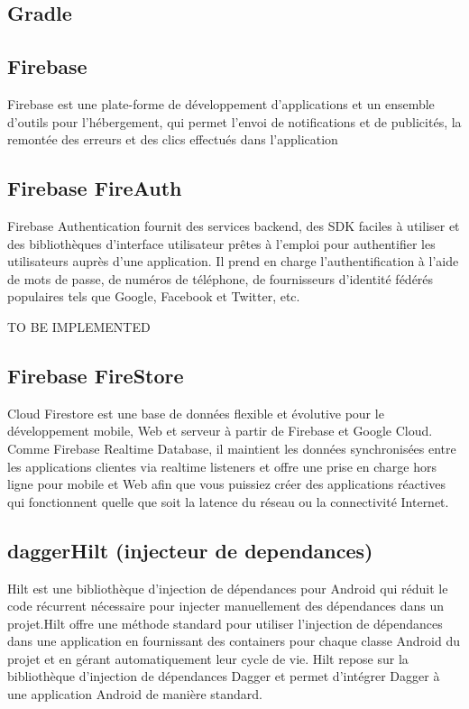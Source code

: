 \subsection{Gradle}
\subsection{Firebase}
Firebase est une plate-forme de développement d'applications et un ensemble d'outils pour l'hébergement, qui permet l'envoi de notifications et de publicités, la remontée des erreurs et des clics effectués dans l'application
\subsection{Firebase FireAuth}
Firebase Authentication fournit des services backend, des SDK faciles à utiliser et des bibliothèques d'interface utilisateur prêtes à l'emploi pour authentifier les utilisateurs auprès d'une application. Il prend en charge l'authentification à l'aide de mots de passe, de numéros de téléphone, de fournisseurs d'identité fédérés populaires tels que Google, Facebook et Twitter, etc.

TO BE IMPLEMENTED
\subsection{Firebase FireStore}
Cloud Firestore est une base de données flexible et évolutive pour le développement mobile, Web et serveur à partir de Firebase et Google Cloud. Comme Firebase Realtime Database, il maintient les données synchronisées entre les applications clientes via realtime listeners et offre une prise en charge hors ligne pour mobile et Web afin que vous puissiez créer des applications réactives qui fonctionnent quelle que soit la latence du réseau ou la connectivité Internet.
\subsection{daggerHilt (injecteur de dependances)}
Hilt est une bibliothèque d'injection de dépendances pour Android qui réduit le code récurrent nécessaire pour injecter manuellement des dépendances dans un projet.Hilt offre une méthode standard pour utiliser l'injection de dépendances dans une application en fournissant des containers pour chaque classe Android du projet et en gérant automatiquement leur cycle de vie. 
Hilt repose sur la bibliothèque d'injection de dépendances Dagger et permet d'intégrer Dagger à une application Android de manière standard.

